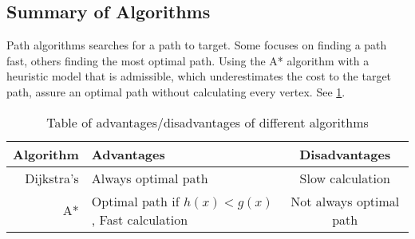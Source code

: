   \subsection{Summary of Algorithms}

  Path algorithms searches for a path to target. Some focuses on finding a path fast, others finding the most optimal path. Using the A* algorithm with a heuristic model that is admissible, which underestimates the cost to the target path, assure an optimal path without calculating every vertex. See \cref{tbl:scheme}.
  
  \begin{table}[ht!]
    \centering
    \begin{tabular}{|r|l|c|}

      \hline
      \textbf{Algorithm} & \textbf{Advantages} & \textbf{Disadvantages} \\
      \hline
      Dijkstra's & Always optimal path & Slow calculation \\
      A* & Optimal path if $h(x)<g(x)$, Fast calculation & Not always optimal path \\
      \hline
    \end{tabular}
    \caption{Table of advantages/disadvantages of different algorithms}
    \label{tbl:scheme}
  \end{table}